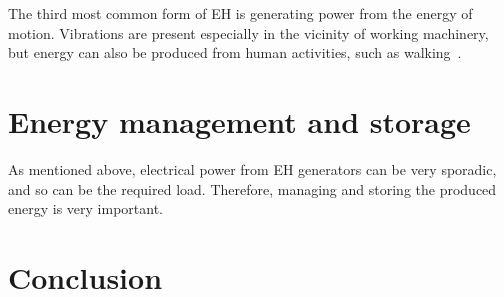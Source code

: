 \documentclass[a4paper,10pt]{article}
\begin{document}
The third most common form of \ac{EH} is generating power from the energy of motion. Vibrations are present especially in the vicinity of working machinery, but energy can also be produced from human activities, such as walking~\cite{piezo-shoe-ieee}. 



\section{Energy management and storage}

As mentioned above, electrical power from \ac{EH} generators can be very sporadic, and so can be the required load. Therefore, managing and storing the produced energy is very important. 

\section{Conclusion}


 
\end{document}
